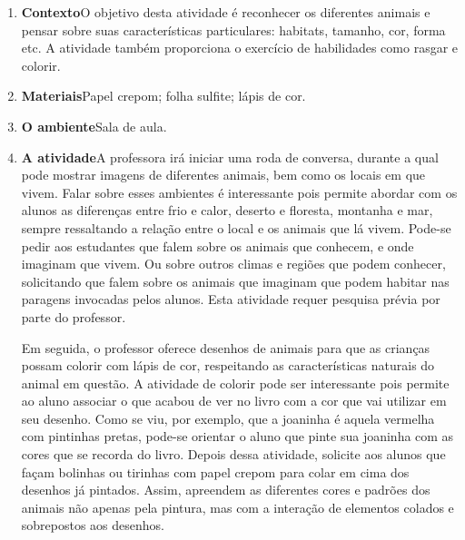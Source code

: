 \documentclass[11pt]{extarticle}
\begin{document}
\begin{enumerate}
\item \textbf{Contexto}\quad O objetivo desta atividade é reconhecer os diferentes animais e pensar sobre suas características particulares: habitats, tamanho, cor, forma etc.
A atividade também proporciona o exercício de habilidades como rasgar e colorir.  

\item \textbf{Materiais}\quad Papel crepom; folha sulfite; lápis de cor.

\item \textbf{O ambiente}\quad Sala de aula. 

\item \textbf{A atividade}\quad A professora irá iniciar uma roda de conversa, durante a qual pode mostrar imagens de diferentes animais, bem como os locais em que vivem.
Falar sobre esses ambientes é interessante pois permite abordar com os alunos as diferenças entre frio e calor, deserto e floresta, montanha e mar, sempre ressaltando a relação entre o local e os animais que lá vivem. Pode-se pedir aos estudantes que falem sobre os animais que conhecem, e onde imaginam que vivem. Ou sobre outros climas e regiões que podem conhecer, solicitando que falem sobre os animais que imaginam que podem habitar nas paragens invocadas pelos alunos.
Esta atividade requer pesquisa prévia por parte do professor.

Em seguida, o professor oferece desenhos de animais para que as crianças possam colorir com lápis de cor, respeitando as características naturais do animal em questão.
A atividade de colorir pode ser interessante pois permite ao aluno associar o que acabou de ver no livro com a cor que vai utilizar em seu desenho. Como se viu, por exemplo, que a joaninha é aquela vermelha com pintinhas pretas, pode-se orientar o aluno que pinte sua joaninha com as cores que se recorda do livro.
Depois dessa atividade, solicite aos alunos que façam bolinhas ou tirinhas com papel crepom para colar em cima dos desenhos já pintados. Assim, apreendem as diferentes cores e padrões dos animais não apenas pela pintura, mas com a interação de elementos colados e sobrepostos aos desenhos.


\end{enumerate}
\end{document}
